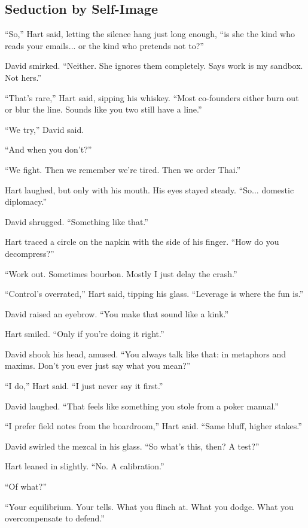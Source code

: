 \subsection{Seduction by Self-Image}

``So,'' Hart said, letting the silence hang just long enough, ``is she the kind who reads your 
emails... or the kind who pretends not to?''

David smirked. ``Neither. She ignores them completely. Says work is my sandbox. Not hers.''

``That’s rare,'' Hart said, sipping his whiskey. ``Most co-founders either burn out or blur the 
line. Sounds like you two still have a line.''

``We try,'' David said.

``And when you don’t?''

``We fight. Then we remember we’re tired. Then we order Thai.''

Hart laughed, but only with his mouth. His eyes stayed steady. ``So... domestic diplomacy.''

David shrugged. ``Something like that.''

Hart traced a circle on the napkin with the side of his finger. ``How do you decompress?''

``Work out. Sometimes bourbon. Mostly I just delay the crash.''

``Control’s overrated,'' Hart said, tipping his glass. ``Leverage is where the fun is.''

David raised an eyebrow. ``You make that sound like a kink.''

Hart smiled. ``Only if you’re doing it right.''

David shook his head, amused. ``You always talk like that: in metaphors and maxims. Don’t 
you ever just say what you mean?''

``I do,'' Hart said. ``I just never say it first.''

David laughed. ``That feels like something you stole from a poker manual.''

``I prefer field notes from the boardroom,'' Hart said. ``Same bluff, higher stakes.''

David swirled the mezcal in his glass. ``So what’s this, then? A test?''

Hart leaned in slightly. ``No. A calibration.''

``Of what?''

``Your equilibrium. Your tells. What you flinch at. What you dodge. What you overcompensate to defend.''

